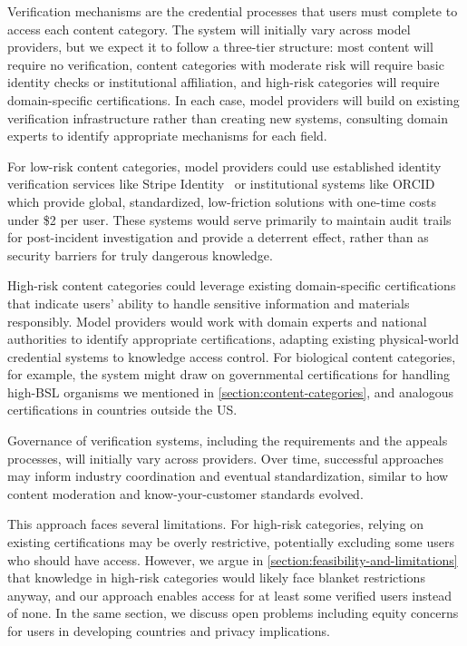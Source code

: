 \documentclass{article}
\theoremstyle{plain}
\theoremstyle{definition}
\theoremstyle{remark}
\begin{document}
Verification mechanisms are the credential processes that users must complete to access each content category.
The system will initially vary across model providers, but we expect it to follow a three-tier structure: most content will require no verification, content categories with moderate risk will require basic identity checks or institutional affiliation, and high-risk categories will require domain-specific certifications.
In each case, model providers will build on existing verification infrastructure rather than creating new systems, consulting domain experts to identify appropriate mechanisms for each field.

For low-risk content categories, model providers could use established identity verification services like Stripe Identity~\cite{stripe_identity_2024} or institutional systems like ORCID~\cite{orcid_2024} which provide global, standardized, low-friction solutions with one-time costs under \$2 per user.
These systems would serve primarily to maintain audit trails for post-incident investigation and provide a deterrent effect, rather than as security barriers for truly dangerous knowledge.

High-risk content categories could leverage existing domain-specific certifications that indicate users' ability to handle sensitive information and materials responsibly.
Model providers would work with domain experts and national authorities to identify appropriate certifications, adapting existing physical-world credential systems to knowledge access control.
For biological content categories, for example, the system might draw on governmental certifications for handling high-BSL organisms we mentioned in \cref{section:content-categories}, and analogous certifications in countries outside the US.

Governance of verification systems, including the requirements and the appeals processes, will initially vary across providers.
Over time, successful approaches may inform industry coordination and eventual standardization, similar to how content moderation and know-your-customer standards evolved.

This approach faces several limitations.
For high-risk categories, relying on existing certifications may be overly restrictive, potentially excluding some users who should have access.
However, we argue in \cref{section:feasibility-and-limitations} that knowledge in high-risk categories would likely face blanket restrictions anyway, and our approach enables access for at least some verified users instead of none.
In the same section, we discuss open problems including equity concerns for users in developing countries and privacy implications.
\end{document}
